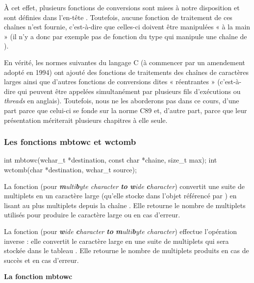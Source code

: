 À cet effet, plusieurs fonctions de conversions sont mises à notre
disposition et sont définies dans l'en-tête
. Toutefois, aucune fonction
de traitement de ces chaînes n'est fournie, c'est-à-dire que celles-ci
doivent être manipulées « à la main » (il n'y a donc par exemple pas de
fonction du type  qui manipule une chaîne de
).

\begin{infobox}
  En vérité, les normes suivantes du
langage C (à commencer par un amendement adopté en 1994) ont ajouté des
fonctions de traitements des chaînes de caractères larges ainsi que
d'autres fonctions de conversions dites « réentrantes » (c'est-à-dire
qui peuvent être appelées simultanément par plusieurs fils d'exécutions
ou \emph{threads} en anglais). Toutefois, nous ne les aborderons pas
dans ce cours, d'une part parce que celui-ci se fonde sur la norme C89
et, d'autre part, parce que leur présentation mériterait plusieurs
chapitres à elle seule.
\end{infobox}


\subsubsection{Les fonctions mbtowc et wctomb}
\label{les-fonctions-mbtowc-et-wctomb}

\begin{C}
int mbtowc(wchar_t *destination, const char *chaine, size_t max);
int wctomb(char *destination, wchar_t source);
\end{C}

La fonction  (pour \emph{\textbf{m}ulti\textbf{b}yte
character \textbf{to} \textbf{w}ide \textbf{c}haracter}) convertit une
suite de multiplets en un caractère large (qu'elle stocke dans l'objet
référencé par ) en lisant au plus 
multiplets depuis la chaîne . Elle retourne le nombre de
multiplets utilisés pour produire le caractère large ou  en
cas d'erreur.

La fonction  (pour \emph{\textbf{w}ide
\textbf{c}haracter \textbf{to} \textbf{m}ulti\textbf{b}yte character})
effectue l'opération inverse : elle convertit le caractère large
 en une suite de multiplets qui sera stockée dans le
tableau . Elle retourne le nombre de multiplets
produits en cas de succès et  en cas d'erreur.

\textbf{La fonction mbtowc}
\label{la-fonction-mbtowc}

